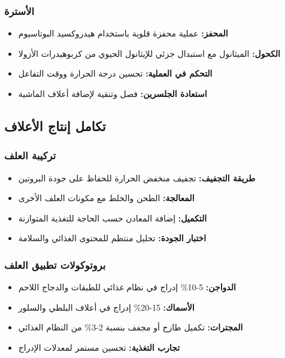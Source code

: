 \subsubsection{الأسترة}
\begin{itemize}
    \item \textbf{المحفز:} عملية محفزة قلوية باستخدام هيدروكسيد البوتاسيوم
    \item \textbf{الكحول:} الميثانول مع استبدال جزئي للإيثانول الحيوي من كربوهيدرات الأزولا
    \item \textbf{التحكم في العملية:} تحسين درجة الحرارة ووقت التفاعل
    \item \textbf{استعادة الجلسرين:} فصل وتنقية لإضافة أعلاف الماشية
\end{itemize}

\subsection{تكامل إنتاج الأعلاف}

\subsubsection{تركيبة العلف}
\begin{itemize}
    \item \textbf{طريقة التجفيف:} تجفيف منخفض الحرارة للحفاظ على جودة البروتين
    \item \textbf{المعالجة:} الطحن والخلط مع مكونات العلف الأخرى
    \item \textbf{التكميل:} إضافة المعادن حسب الحاجة للتغذية المتوازنة
    \item \textbf{اختبار الجودة:} تحليل منتظم للمحتوى الغذائي والسلامة
\end{itemize}

\subsubsection{بروتوكولات تطبيق العلف}
\begin{itemize}
    \item \textbf{الدواجن:} 5-10\% إدراج في نظام غذائي للطبقات والدجاج اللاحم
    \item \textbf{الأسماك:} 15-20\% إدراج في أعلاف البلطي والسلور
    \item \textbf{المجترات:} تكميل طازج أو مجفف بنسبة 2-3\% من النظام الغذائي
    \item \textbf{تجارب التغذية:} تحسين مستمر لمعدلات الإدراج
\end{itemize}

